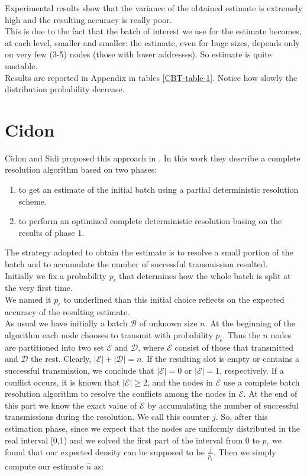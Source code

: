 \documentclass[12pt,a4paper]{report}
\newcommand{\pc}{p_{\epsilon}}
\begin{document}
Experimental results show that the variance of the obtained estimate is extremely high and the resulting accuracy is really poor.\\ 
This is due to the fact that the batch of interest we use for the estimate becomes, at each level, smaller and smaller: the estimate, even for huge sizes, depends only on very few (3-5) nodes (those with lower addresses). So estimate is quite unstable.\\
Results are reported in Appendix in tables  \ref{CBT-table-1}. Notice how slowly the distribution probability decrease.
\section{Cidon}

Cidon and Sidi proposed this approach in \cite{cidon}. In this work they describe a complete resolution algorithm based on two phases:
 
\begin{enumerate}
\item to get an estimate of the initial batch using a partial deterministic resolution scheme. 
\item to perform an optimized complete deterministic resolution basing on the results of phase 1. 
\end{enumerate}

The strategy adopted to obtain the estimate is to resolve a small portion of the batch and to accumulate the number of successful transmission resulted.\\

Initially we fix a probability $\pc$ that determines how the whole batch is split at the very first time.\\
We named it $\pc$ to underlined than this initial choice reflects on the expected accuracy of the resulting estimate.\\

As usual we have initially a batch $\mathcal{B}$ of unknown size $n$.
At the beginning of the algorithm each node chooses to transmit with probability $\pc$. Thus the $n$ nodes are partitioned into two set $\mathcal{E}$ and $\mathcal{D}$, where $\mathcal{E}$ consist of those that transmitted and $\mathcal{D}$ the rest. Clearly, $|\mathcal{E}|+|\mathcal{D}|=n$. If the resulting slot is empty or contains a successful transmission, we conclude that $|\mathcal{E}|=0$  or $|\mathcal{E}|=1$, respectively. If a conflict occurs, it is known that $|\mathcal{E}|\geq2$, and the nodes in $\mathcal{E}$ use a complete batch resolution algorithm to resolve the conflicts among the nodes in $\mathcal{E}$. At the end of this part we know the exact value of $\mathcal{E}$ by accumulating the number of successful transmissions during the resolution. We call this counter $j$.
So, after this estimation phase, since we expect that the nodes are uniformly distributed in the real interval [0,1) and we solved the first part of the interval from 0 to $\pc$ we found that our expected density can be supposed to be $\frac{j}{\pc}$.
Then we simply compute our estimate $\hat{n}$ as: 
\end{document}
